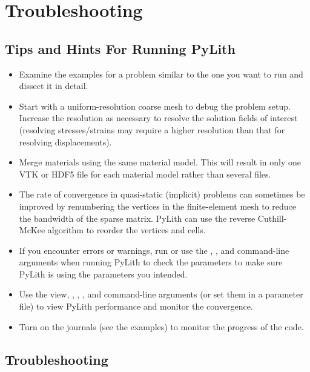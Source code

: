 \section{Troubleshooting}
\label{sec:troubleshooting}

\subsection{Tips and Hints For Running PyLith}
\begin{itemize}
\item Examine the examples for a problem similar to the one you want to
run and dissect it in detail.
\item Start with a uniform-resolution coarse mesh to debug the problem setup.
Increase the resolution as necessary to resolve the solution fields
of interest (resolving stresses/strains may require a higher resolution
than that for resolving displacements).
\item Merge materials using the same material model. This will result in
only one VTK or HDF5 file for each material model rather than several
files.
\item The rate of convergence in quasi-static (implicit) problems can sometimes
be improved by renumbering the vertices in the finite-element mesh
to reduce the bandwidth of the sparse matrix. PyLith can use the reverse
Cuthill-McKee algorithm to reorder the vertices and cells.
\item If you encounter errors or warnings, run  or use
the , , and 
command-line arguments when running PyLith to check the parameters
to make sure PyLith is using the parameters you intended.
\item Use the view, ,
, , and 
command-line arguments (or set them in a parameter file) to view PyLith
performance and monitor the convergence.
\item Turn on the journals (see the examples) to monitor the progress of
the code.
\end{itemize}

\subsection{Troubleshooting}
\label{sec:Troubleshooting}

